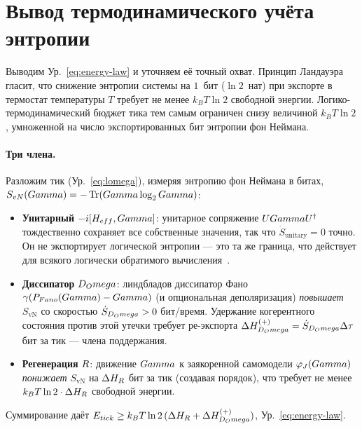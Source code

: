 \section{Вывод термодинамического учёта энтропии}
\label{app:energy}

Выводим Ур.~\eqref{eq:energy-law} и уточняем её точный охват. Принцип
Ландауэра~\cite{landauer1961} гласит, что снижение энтропии системы на $1$~бит
($\ln 2$~нат) при экспорте в термостат температуры $T$ требует не менее
$k_B T\ln 2$ свободной энергии. Логико-термодинамический бюджет тика тем самым
ограничен снизу величиной $k_B T\ln 2$, умноженной на число экспортированных бит
энтропии фон Неймана.

\paragraph{Три члена.} Разложим тик (Ур.~\ref{eq:lomega}), измеряя энтропию фон
Неймана в битах, $S_{vN}(Gamma)=-\Tr(Gamma\log_2Gamma)$:
\begin{itemize}[leftmargin=1.5em,itemsep=1pt]
  \item \textbf{Унитарный} $-i[H_{eff},Gamma]$: унитарное сопряжение
        $UGamma U^\dagger$ тождественно сохраняет все собственные значения, так
        что $\dot S_{\mathrm{unitary}}=0$ точно. Он не экспортирует логической
        энтропии --- это та же граница, что действует для всякого логически
        обратимого вычисления~\cite{bennett1973}.
  \item \textbf{Диссипатор} $D_Omega$: линдбладов диссипатор Фано
        $\gamma(P_{Fano}(Gamma)-Gamma)$ (и опциональная
        деполяризация) \emph{повышает} $S_{\mathrm{vN}}$ со скоростью
        $\dot S_{D_Omega}>0$ бит/время. Удержание когерентного состояния против
        этой утечки требует ре-экспорта
        $\Delta H_{D_Omega}^{(+)}=\dot S_{D_Omega}\Delta\tau$ бит за тик --- члена
        поддержания.
  \item \textbf{Регенерация} $R$: движение $Gamma$ к заякоренной самомодели
        $\varphi_J(Gamma)$ \emph{понижает} $S_{\mathrm{vN}}$ на
        $\Delta H_{R}$ бит за тик (создавая порядок), что требует не менее
        $k_B T\ln 2\cdot\Delta H_{R}$ свободной энергии.
\end{itemize}
Суммирование даёт $E_{tick}\ge k_B T\ln 2\,(\Delta H_{R}+\Delta H_{D_Omega}^{(+)})$,
Ур.~\eqref{eq:energy-law}.

